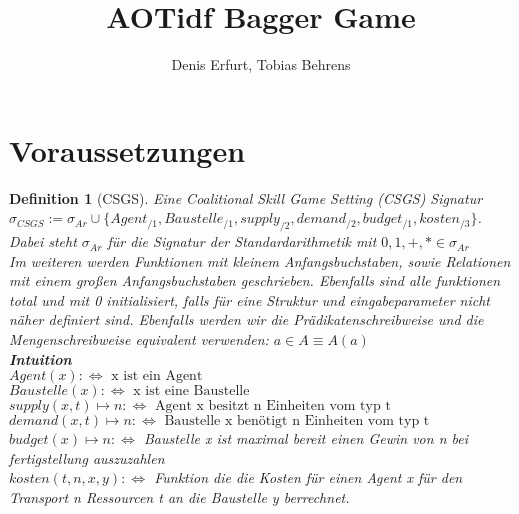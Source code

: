 \documentclass[12pt]{article}
\theoremstyle{break}
\newtheorem{definition}{Definition}
\begin{document}
\title{AOTidf Bagger Game}
\author{Denis Erfurt, Tobias Behrens}
\maketitle

\section{Voraussetzungen}

\begin{definition}[CSGS]
  Eine Coalitional Skill Game Setting (CSGS) Signatur\\
  $\sigma_{CSGS}:=\sigma_{Ar}\cup\{Agent_{/1}, Baustelle_{/1}, supply_{/2}, demand_{/2}, budget_{/1}, kosten_{/3} \}$. Dabei steht $\sigma_{Ar}$ für die Signatur der Standardarithmetik mit $0,1,+,*\in\sigma_{Ar}$ \\
  Im weiteren werden Funktionen mit kleinem Anfangsbuchstaben, sowie Relationen mit einem großen Anfangsbuchstaben geschrieben. Ebenfalls sind alle funktionen total und mit 0 initialisiert, falls für eine Struktur und eingabeparameter nicht näher definiert sind.
  Ebenfalls werden wir die Prädikatenschreibweise und die Mengenschreibweise equivalent verwenden: $a\in A \equiv A(a)$
    \\ \textbf{Intuition} \\
    $Agent(x) :\Leftrightarrow\text{ x ist ein Agent}$ \\
    $Baustelle(x) :\Leftrightarrow\text{ x ist eine Baustelle}$ \\
    $supply(x, t)\mapsto n :\Leftrightarrow\text{ Agent x besitzt n Einheiten vom typ t}$ \\
    $demand(x, t)\mapsto n :\Leftrightarrow\text{ Baustelle x benötigt n Einheiten vom typ t}$ \\
    $budget(x)\mapsto n :\Leftrightarrow$
    Baustelle x ist maximal bereit einen Gewin von n bei fertigstellung auszuzahlen \\
    $kosten(t, n, x, y):\Leftrightarrow$ Funktion die die Kosten für einen Agent x für den Transport n Ressourcen t an die Baustelle y berrechnet.
\end{definition}
\end{document}
